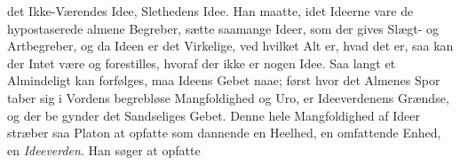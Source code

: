 \documentclass[12pt,a4paper]{book}
\newcommand{\gk}[1]{\textit{#1}}
\begin{document}
det Ikke-Værendes Idee, Slethedens Idee. Han maatte, idet
Ideerne vare de hypostaserede almene Begreber, sætte saamange
Ideer, som der gives Slægt- og Artbegreber, og da Ideen er
det Virkelige, ved hvilket Alt er, hvad det er, saa kan der
Intet være og forestilles, hvoraf der ikke er nogen Idee. Saa\-%
langt et Almindeligt kan forfølges, maa Ideens Gebet naae;
først hvor det Almenes Spor taber sig i Vordens begrebløse
Mangfoldighed og Uro, er Ideeverdenens Grændse, og der be\-%
gynder det Sandseliges Gebet. Denne hele Mangfoldighed af
Ideer stræber saa Platon at opfatte som dannende en Heelhed,
en omfattende Enhed, en \emph{Ideeverden}. Han søger at opfatte
\end{document}
